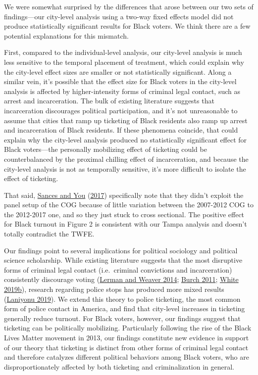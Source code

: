 \documentclass[
  12pt,
]{article}
\begin{document}
We were somewhat surprised by the differences that arose between our two sets of findings---our city-level analysis using a two-way fixed effects model did not produce statistically significant results for Black voters. We think there are a few potential explanations for this mismatch.

First, compared to the individual-level analysis, our city-level analysis is much less sensitive to the temporal placement of treatment, which could explain why the city-level effect sizes are smaller or not statistically significant. Along a similar vein, it's possible that the effect size for Black voters in the city-level analysis is affected by higher-intensity forms of criminal legal contact, such as arrest and incarceration. The bulk of existing literature suggests that incarceration discourages political participation, and it's not unreasonable to assume that cities that ramp up ticketing of Black residents also ramp up arrest and incarceration of Black residents. If these phenomena coincide, that could explain why the city-level analysis produced no statistically significant effect for Black voters---the personally mobilizing effect of ticketing could be counterbalanced by the proximal chilling effect of incarceration, and because the city-level analysis is not as temporally sensitive, it's more difficult to isolate the effect of ticketing.

That said, \protect\hyperlink{ref-Sances2017}{Sances and You} (\protect\hyperlink{ref-Sances2017}{2017}) specifically note that they didn't exploit the panel setup of the COG because of little variation between the 2007-2012 COG to the 2012-2017 one, and so they just stuck to cross sectional. The positive effect for Black turnout in Figure 2 is consistent with our Tampa analysis and doesn't totally contradict the TWFE.

Our findings point to several implications for political sociology and political science scholarship. While existing literature suggests that the most disruptive forms of criminal legal contact (i.e.~criminal convictions and incarceration) consistently discourage voting (\protect\hyperlink{ref-Lerman2014}{Lerman and Weaver 2014}; \protect\hyperlink{ref-Burch2011}{Burch 2011}; \protect\hyperlink{ref-White2019a}{White 2019b}), research regarding police stops has produced more mixed results (\protect\hyperlink{ref-Laniyonu2019}{Laniyonu 2019}). We extend this theory to police ticketing, the most common form of police contact in America, and find that city-level increases in ticketing generally reduce turnout. For Black voters, however, our findings suggest that ticketing can be politically mobilizing. Particularly following the rise of the Black Lives Matter movement in 2013, our findings constitute new evidence in support of our theory that ticketing is distinct from other forms of criminal legal contact and therefore catalyzes different political behaviors among Black voters, who are disproportionately affected by both ticketing and criminalization in general.
\end{document}

